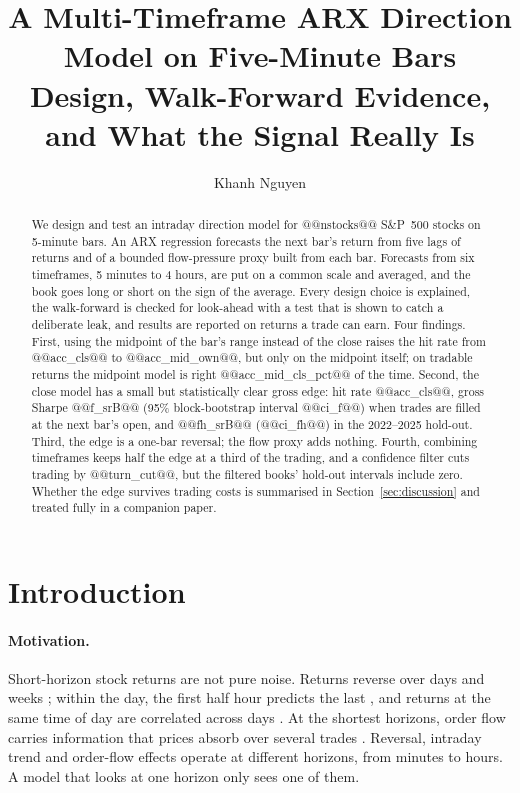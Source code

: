 \documentclass[11pt,a4paper]{article}
\title{\textbf{A Multi-Timeframe ARX Direction Model on Five-Minute Bars}\\[0.4em]
\large Design, Walk-Forward Evidence, and What the Signal Really Is}
\author{Khanh Nguyen}
\date{}
\begin{document}
\maketitle

\begin{abstract}
\noindent We design and test an intraday direction model for @@nstocks@@ S\&P~500 stocks on 5-minute
bars. An ARX regression forecasts the next bar's return from five lags of returns and of a bounded
flow-pressure proxy built from each bar. Forecasts from six timeframes, 5 minutes to 4 hours, are put
on a common scale and averaged, and the book goes long or short on the sign of the average. Every
design choice is explained, the walk-forward is checked for look-ahead with a test that is shown to
catch a deliberate leak, and results are reported on returns a trade can earn. Four findings. First,
using the midpoint of the bar's range instead of the close raises the hit rate from @@acc_cls@@ to
@@acc_mid_own@@, but only on the midpoint itself; on tradable returns the midpoint model is right
@@acc_mid_cls_pct@@ of the time. Second, the close model has a small but statistically clear gross edge: hit rate @@acc_cls@@, gross
Sharpe @@f_srB@@ (95\% block-bootstrap interval @@ci_f@@) when trades are filled at the next bar's open,
and @@fh_srB@@ (@@ci_fh@@) in the 2022--2025 hold-out. Third, the edge is a one-bar reversal; the flow proxy
adds nothing. Fourth, combining timeframes keeps half the edge at a third of the trading, and a
confidence filter cuts trading by @@turn_cut@@, but the filtered books' hold-out intervals include zero. Whether the edge survives trading costs
is summarised in Section~\ref{sec:discussion} and treated fully in a companion paper.
\end{abstract}

\section{Introduction}
\label{sec:intro}

\paragraph{Motivation.} Short-horizon stock returns are not pure noise. Returns reverse over days and
weeks \citep{lehmann1990,jegadeesh1995}; within the day, the first half hour predicts the last
\citep{gao2018}, and returns at the same time of day are correlated across days \citep{heston2010}. At
the shortest horizons, order flow carries information that prices absorb over several trades
\citep{kyle1985,hasbrouck1991}. Reversal, intraday trend and order-flow effects operate at different horizons, from minutes to hours. A
model that looks at one horizon only sees one of them.
\end{document}
